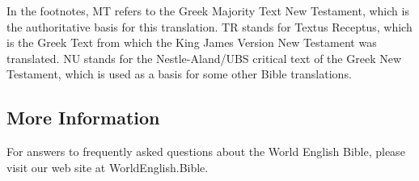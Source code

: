 In the footnotes, MT refers to the Greek Majority Text New Testament,
which is the authoritative basis for this translation. TR stands for
Textus Receptus, which is the Greek Text from which the King James
Version New Testament was translated. NU stands for the Nestle-Aland/UBS
critical text of the Greek New Testament, which is used as a basis for
some other Bible translations.

\hypertarget{more-information}{%
\subsection{More Information}\label{more-information}}

For answers to frequently asked questions about the World English Bible,
please visit our web site at WorldEnglish.Bible.

